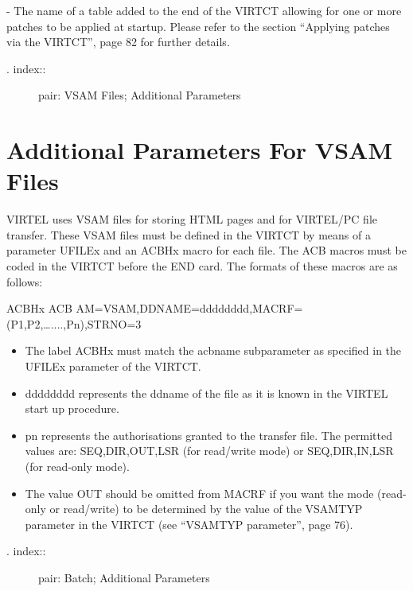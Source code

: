 \documentclass[letterpaper,10pt,english]{sphinxmanual}
\begin{document}
 - The name of a table added to the end of the VIRTCT allowing for one or more patches to be applied at startup. Please refer to the section “Applying patches via the VIRTCT”, page 82 for further details.
\begin{description}
\item[{. index::}] \leavevmode
pair: VSAM Files; Additional Parameters

\end{description}


\section{Additional Parameters For VSAM Files}
\label{\detokenize{Installation_Guide:additional-parameters-for-vsam-files}}
VIRTEL uses VSAM files for storing HTML pages and for VIRTEL/PC file transfer. These VSAM files must be defined in the VIRTCT by means of a parameter UFILEx and an ACBHx macro for each file. The ACB macros must be coded in the VIRTCT before the END card. The formats of these macros are as follows:

\begin{sphinxVerbatim}[commandchars=\\\{\}]
ACBHx ACB AM=VSAM,DDNAME=dddddddd,MACRF=(P1,P2,…....,Pn),STRNO=3
\end{sphinxVerbatim}
\begin{itemize}
\item {} 
The label ACBHx must match the acbname subparameter as specified in the UFILEx parameter of the VIRTCT.

\item {} 
dddddddd represents the ddname of the file as it is known in the VIRTEL start up procedure.

\item {} 
pn represents the authorisations granted to the transfer file. The permitted values are: SEQ,DIR,OUT,LSR (for read/write mode) or SEQ,DIR,IN,LSR (for read-only mode).

\item {} 
The value OUT should be omitted from MACRF if you want the mode (read-only or read/write) to be determined by the value of the VSAMTYP parameter in the VIRTCT (see “VSAMTYP parameter”, page 76).

\end{itemize}
\label{\detokenize{Installation_Guide:v457ig-bookmark72}}\begin{description}
\item[{. index::}] \leavevmode
pair: Batch; Additional Parameters

\end{description}
\end{document}
